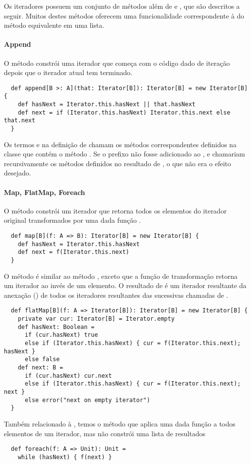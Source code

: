 Os iteradores possuem um conjunto de métodos além de  e
, que são descritos a seguir. Muitos destes métodos
oferecem uma funcionalidade correspondente à do método equivalente em uma lista.

\paragraph{Append}
O método  constrói uma iterador que começa com o código dado de iteração ~~ depois 
que o iterador atual tem terminado.
\begin{lstlisting}
  def append[B >: A](that: Iterator[B]): Iterator[B] = new Iterator[B] {
    def hasNext = Iterator.this.hasNext || that.hasNext
    def next = if (Iterator.this.hasNext) Iterator.this.next else that.next
  }    
\end{lstlisting}
Os termos  e 
na definição de  chamam os métodos correspondentes definidos na classe  
que contém o método . Se o prefixo
 não fosse adicionado ao ,
 e  chamariam recursivamente os métodos definidos no resultado de ,
o que não era o efeito desejado.

\paragraph{Map, FlatMap, Foreach} O método  
constrói um iterador que retorna todos os elementos do iterador original transformados por uma dada função .
\begin{lstlisting}
  def map[B](f: A => B): Iterator[B] = new Iterator[B] {
    def hasNext = Iterator.this.hasNext
    def next = f(Iterator.this.next)
  }
\end{lstlisting}
O método  é similar ao método , exceto que a função de transformação  retorna um iterador 
ao invés de um elemento. O resultado de  é um iterador resultante da anexação () de todos os iteradores resultantes
das sucessivas chamadas de .
\begin{lstlisting}
  def flatMap[B](f: A => Iterator[B]): Iterator[B] = new Iterator[B] {
    private var cur: Iterator[B] = Iterator.empty
    def hasNext: Boolean =
      if (cur.hasNext) true
      else if (Iterator.this.hasNext) { cur = f(Iterator.this.next); hasNext }
      else false
    def next: B =
      if (cur.hasNext) cur.next
      else if (Iterator.this.hasNext) { cur = f(Iterator.this.next); next }
      else error("next on empty iterator")
  }
\end{lstlisting}
Também relacionado à , temos o método  que aplica uma
dada função a todos elementos de um iterador, mas não constrói uma lista de resultados
\begin{lstlisting}
  def foreach(f: A => Unit): Unit =
    while (hasNext) { f(next) }
\end{lstlisting}

